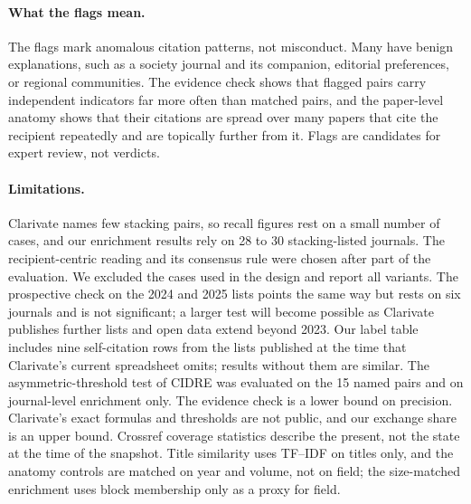 \paragraph{What the flags mean.}
The flags mark anomalous citation patterns, not misconduct. Many have benign explanations, such as a society journal
and its companion, editorial preferences, or regional communities. The evidence check shows that flagged pairs carry
independent indicators far more often than matched pairs, and the paper-level anatomy shows that their citations are
spread over many papers that cite the recipient repeatedly and are topically further from it. Flags are candidates for
expert review, not verdicts.

\paragraph{Limitations.}
Clarivate names few stacking pairs, so recall figures rest on a small number of cases, and our enrichment results rely
on 28 to 30 stacking-listed journals. The recipient-centric reading and its consensus rule were chosen after part of
the evaluation. We excluded the cases used in the design and report all variants. The prospective check on the 2024
and 2025 lists points the same way but rests on six journals and is not significant; a larger test will become possible
as Clarivate publishes further lists and open data extend beyond 2023. Our label table includes nine self-citation rows
from the lists published at the time that Clarivate's current spreadsheet omits; results without them are similar.
The asymmetric-threshold test of CIDRE was evaluated on the 15 named pairs and on journal-level enrichment only.
The evidence check is a lower bound on precision. Clarivate's exact formulas and thresholds are not
public, and our exchange share is an upper bound. Crossref coverage statistics describe the present, not the state at
the time of the snapshot. Title similarity uses TF--IDF on titles only, and the anatomy controls are matched on year and volume, not on
field; the size-matched enrichment uses block membership only as a proxy for field.

